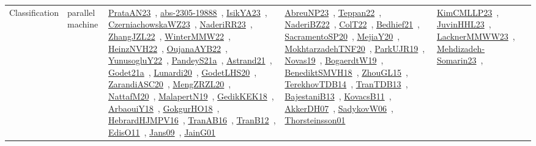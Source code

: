 {\begin{longtable}{lp{3cm}>{\raggedright\arraybackslash}p{6cm}>{\raggedright\arraybackslash}p{6cm}>{\raggedright\arraybackslash}p{8cm}}
Classification & parallel machine & \href{works/PrataAN23.pdf}{PrataAN23}~\cite{PrataAN23}, \href{works/abs-2305-19888.pdf}{abs-2305-19888}~\cite{abs-2305-19888}, \href{works/IsikYA23.pdf}{IsikYA23}~\cite{IsikYA23}, \href{works/CzerniachowskaWZ23.pdf}{CzerniachowskaWZ23}~\cite{CzerniachowskaWZ23}, \href{works/NaderiRR23.pdf}{NaderiRR23}~\cite{NaderiRR23}, \href{works/ZhangJZL22.pdf}{ZhangJZL22}~\cite{ZhangJZL22}, \href{works/WinterMMW22.pdf}{WinterMMW22}~\cite{WinterMMW22}, \href{works/HeinzNVH22.pdf}{HeinzNVH22}~\cite{HeinzNVH22}, \href{works/OujanaAYB22.pdf}{OujanaAYB22}~\cite{OujanaAYB22}, \href{works/YunusogluY22.pdf}{YunusogluY22}~\cite{YunusogluY22}, \href{works/PandeyS21a.pdf}{PandeyS21a}~\cite{PandeyS21a}, \href{works/Astrand21.pdf}{Astrand21}~\cite{Astrand21}, \href{works/Godet21a.pdf}{Godet21a}~\cite{Godet21a}, \href{works/Lunardi20.pdf}{Lunardi20}~\cite{Lunardi20}, \href{works/GodetLHS20.pdf}{GodetLHS20}~\cite{GodetLHS20}, \href{works/ZarandiASC20.pdf}{ZarandiASC20}~\cite{ZarandiASC20}, \href{works/MengZRZL20.pdf}{MengZRZL20}~\cite{MengZRZL20}, \href{works/NattafM20.pdf}{NattafM20}~\cite{NattafM20}, \href{works/MalapertN19.pdf}{MalapertN19}~\cite{MalapertN19}, \href{works/GedikKEK18.pdf}{GedikKEK18}~\cite{GedikKEK18}, \href{works/ArbaouiY18.pdf}{ArbaouiY18}~\cite{ArbaouiY18}, \href{works/GokgurHO18.pdf}{GokgurHO18}~\cite{GokgurHO18}, \href{works/HebrardHJMPV16.pdf}{HebrardHJMPV16}~\cite{HebrardHJMPV16}, \href{works/TranAB16.pdf}{TranAB16}~\cite{TranAB16}, \href{works/TranB12.pdf}{TranB12}~\cite{TranB12}, \href{works/EdisO11.pdf}{EdisO11}~\cite{EdisO11}, \href{works/Jans09.pdf}{Jans09}~\cite{Jans09}, \href{works/JainG01.pdf}{JainG01}~\cite{JainG01} & \href{works/AbreuNP23.pdf}{AbreuNP23}~\cite{AbreuNP23}, \href{works/Teppan22.pdf}{Teppan22}~\cite{Teppan22}, \href{works/NaderiBZ22.pdf}{NaderiBZ22}~\cite{NaderiBZ22}, \href{works/ColT22.pdf}{ColT22}~\cite{ColT22}, \href{works/Bedhief21.pdf}{Bedhief21}~\cite{Bedhief21}, \href{works/SacramentoSP20.pdf}{SacramentoSP20}~\cite{SacramentoSP20}, \href{works/MejiaY20.pdf}{MejiaY20}~\cite{MejiaY20}, \href{works/MokhtarzadehTNF20.pdf}{MokhtarzadehTNF20}~\cite{MokhtarzadehTNF20}, \href{works/ParkUJR19.pdf}{ParkUJR19}~\cite{ParkUJR19}, \href{works/Novas19.pdf}{Novas19}~\cite{Novas19}, \href{works/BogaerdtW19.pdf}{BogaerdtW19}~\cite{BogaerdtW19}, \href{works/BenediktSMVH18.pdf}{BenediktSMVH18}~\cite{BenediktSMVH18}, \href{works/ZhouGL15.pdf}{ZhouGL15}~\cite{ZhouGL15}, \href{works/TerekhovTDB14.pdf}{TerekhovTDB14}~\cite{TerekhovTDB14}, \href{works/TranTDB13.pdf}{TranTDB13}~\cite{TranTDB13}, \href{works/BajestaniB13.pdf}{BajestaniB13}~\cite{BajestaniB13}, \href{works/KovacsB11.pdf}{KovacsB11}~\cite{KovacsB11}, \href{works/AkkerDH07.pdf}{AkkerDH07}~\cite{AkkerDH07}, \href{works/SadykovW06.pdf}{SadykovW06}~\cite{SadykovW06}, \href{works/Thorsteinsson01.pdf}{Thorsteinsson01}~\cite{Thorsteinsson01} & \href{works/KimCMLLP23.pdf}{KimCMLLP23}~\cite{KimCMLLP23}, \href{works/JuvinHHL23.pdf}{JuvinHHL23}~\cite{JuvinHHL23}, \href{works/LacknerMMWW23.pdf}{LacknerMMWW23}~\cite{LacknerMMWW23}, \href{works/Mehdizadeh-Somarin23.pdf}{Mehdizadeh-Somarin23}~\cite{Mehdizadeh-Somarin23}, 
\end{longtable}}
